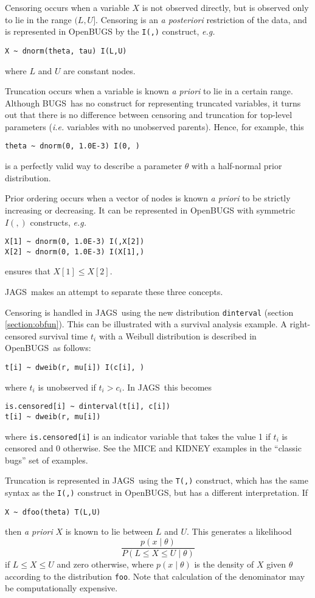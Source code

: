 \documentclass[11pt, a4paper, titlepage]{report}
\newcommand{\JAGS}{\textsf{JAGS}}
\newcommand{\BUGS}{\textsf{BUGS}}
\newcommand{\OpenBUGS}{\textsf{OpenBUGS}}
\begin{document}
Censoring occurs when a variable $X$ is not observed directly,
but is observed only to lie in the range $(L,U]$.  Censoring is
an {\em a posteriori} restriction of the data, and is represented
in OpenBUGS by the \texttt{I(,)} construct, {\em e.g.}
\begin{verbatim}
X ~ dnorm(theta, tau) I(L,U)
\end{verbatim}
where $L$ and $U$ are constant nodes.

Truncation occurs when a variable is known {\em a priori} to lie in
a certain range.  Although \BUGS\ has no construct for representing
truncated variables, it turns out that there is no difference between
censoring and truncation for top-level parameters ({\em i.e.} variables
with no unobserved parents).  Hence, for example, this
\begin{verbatim}
theta ~ dnorm(0, 1.0E-3) I(0, )
\end{verbatim}
is a perfectly valid way to describe a parameter $\theta$ with a
half-normal prior distribution.

Prior ordering occurs when a vector of nodes is known {\em a priori}
to be strictly increasing or decreasing. It can be represented in
OpenBUGS with symmetric $I(,)$ constructs,  {\em e.g.}
\begin{verbatim}
X[1] ~ dnorm(0, 1.0E-3) I(,X[2])
X[2] ~ dnorm(0, 1.0E-3) I(X[1],)
\end{verbatim}
ensures that $X[1] \leq X[2]$.

\JAGS\ makes an attempt to separate these three concepts.

Censoring is handled in \JAGS\ using the new distribution
\texttt{dinterval} (section \ref{section:obfun}). This can be
illustrated with a survival analysis example.  A right-censored
survival time $t_i$ with a Weibull distribution is described in
\OpenBUGS\ as follows:
\begin{verbatim}
t[i] ~ dweib(r, mu[i]) I(c[i], )
\end{verbatim}
where $t_i$ is unobserved if $t_i > c_i$.  In \JAGS\ this becomes
\begin{verbatim}
is.censored[i] ~ dinterval(t[i], c[i])
t[i] ~ dweib(r, mu[i])
\end{verbatim}
where \verb+is.censored[i]+ is an indicator variable that takes the
value 1 if $t_i$ is censored and 0 otherwise. See the MICE and KIDNEY
examples in the ``classic bugs'' set of examples.

Truncation is represented in \JAGS\ using the \texttt{T(,)} construct,
which has the same syntax as the \texttt{I(,)} construct in \OpenBUGS,
but has a different interpretation. If
\begin{verbatim}
X ~ dfoo(theta) T(L,U)
\end{verbatim}
then {\em a priori} $X$ is known to lie between $L$ and $U$. This
generates a likelihood
\[
\frac{p(x \mid \theta)}{P(L \leq X \leq U \mid \theta)}
\]
if $L \leq X \leq U$ and zero otherwise, where $p(x \mid \theta)$ is
the density of $X$ given $\theta$ according to the distribution
\texttt{foo}. Note that calculation of the denominator may be
computationally expensive.
\end{document}
